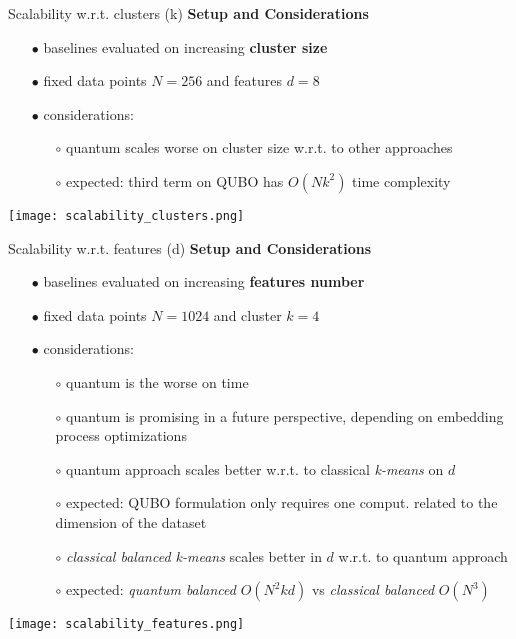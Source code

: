 		\begin{frame}[allowframebreaks]{Scalability w.r.t. clusters (k)}
			\textbf{Setup and Considerations}
			\begin{itemize}
				\item[$\bullet$] baselines evaluated on increasing \textbf{cluster size}
				\item[$\bullet$] fixed data points $N=256$ and features $d=8$
				\item[$\bullet$] considerations:
				\begin{itemize}
					\item[$\circ$] quantum scales worse on cluster size w.r.t. to other approaches
					\item[$\circ$] expected: third term on QUBO has $O(Nk^2)$ time complexity
				\end{itemize} 
			\end{itemize}
			\begin{center}
				\texttt{[image: scalability\_clusters.png]}
			\end{center}
		\end{frame}

		\begin{frame}[allowframebreaks]{Scalability w.r.t. features (d)}
			\textbf{Setup and Considerations}
			\begin{itemize}
				\item[$\bullet$] baselines evaluated on increasing \textbf{features number}
				\item[$\bullet$] fixed data points $N=1024$ and cluster $k=4$ 
				\item[$\bullet$] considerations:
				\begin{itemize}
					\item[$\circ$] quantum is the worse on time 
					\item[$\circ$] quantum is promising in a future perspective, depending on embedding process optimizations
					\item[$\circ$] quantum approach scales better w.r.t. to classical \textit{k-means} on $d$  
					\item[$\circ$] expected: QUBO formulation only requires one comput. related to the dimension of the dataset
					\item[$\circ$] \textit{classical balanced k-means} scales better in $d$ w.r.t. to quantum approach 
					\item[$\circ$] expected: \textit{quantum balanced} $O(N^2kd)$ vs \textit{classical balanced} $O(N^3)$  
				\end{itemize} 
			\end{itemize}
			\begin{center}
				\texttt{[image: scalability\_features.png]}
			\end{center}
		\end{frame}
	
